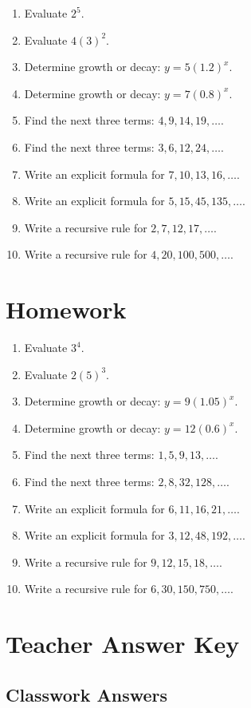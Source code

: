 \documentclass[11pt]{book}
\begin{document}
\begin{enumerate}
\item Evaluate \(2^5\).
\item Evaluate \(4(3)^2\).
\item Determine growth or decay: \(y=5(1.2)^x\).
\item Determine growth or decay: \(y=7(0.8)^x\).
\item Find the next three terms: \(4,9,14,19,\ldots\).
\item Find the next three terms: \(3,6,12,24,\ldots\).
\item Write an explicit formula for \(7,10,13,16,\ldots\).
\item Write an explicit formula for \(5,15,45,135,\ldots\).
\item Write a recursive rule for \(2,7,12,17,\ldots\).
\item Write a recursive rule for \(4,20,100,500,\ldots\).
\end{enumerate}

\section{Homework}

\begin{enumerate}
\item Evaluate \(3^4\).
\item Evaluate \(2(5)^3\).
\item Determine growth or decay: \(y=9(1.05)^x\).
\item Determine growth or decay: \(y=12(0.6)^x\).
\item Find the next three terms: \(1,5,9,13,\ldots\).
\item Find the next three terms: \(2,8,32,128,\ldots\).
\item Write an explicit formula for \(6,11,16,21,\ldots\).
\item Write an explicit formula for \(3,12,48,192,\ldots\).
\item Write a recursive rule for \(9,12,15,18,\ldots\).
\item Write a recursive rule for \(6,30,150,750,\ldots\).
\end{enumerate}

\section{Teacher Answer Key}

\subsection{Classwork Answers}
\end{document}
